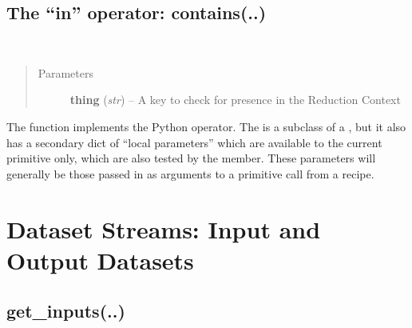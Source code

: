 \documentclass[letterpaper,10pt,english]{sphinxmanual}
\begin{document}
\subsection{The ``in'' operator: contains(..)}
\label{chapter_ReductionContextClass:the-in-operator-contains}

\begin{fulllineitems}
\label{chapter_ReductionContextClass:astrodata.RecipeManager.ReductionContext.__contains__}~\begin{quote}\begin{description}
\item[{Parameters}] \leavevmode
\textbf{thing} (\emph{str}) -- A key to check for presence in the Reduction Context

\end{description}\end{quote}

The  function implements the Python  operator. The 
 is a subclass of a , but it also has a secondary
dict of ``local parameters'' which are available to the current primitive         only, which are also tested by the  member.
These parameters will generally be those passed in as arguments
to a primitive call from a recipe.

\end{fulllineitems}



\section{Dataset Streams: Input and Output Datasets}
\label{chapter_ReductionContextClass:dataset-streams-input-and-output-datasets}

\subsection{get\_inputs(..)}
\label{chapter_ReductionContextClass:get-inputs}
\end{document}
